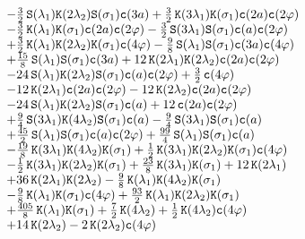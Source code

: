 \documentclass[a4paper,12pt]{article}
\begin{document}
\begin{equation}
\begin{array}{lll}
&&-\frac{3}{2}\,\sinhx{ \lambda_1} \coshx{2 \lambda_2} \sinhx{ \sigma_1} \cosx{3 a}
+\frac{3}{2}\,\coshx{3 \lambda_1} \coshx{ \sigma_1} \cosx{2 a} \cosx{2 \varphi}\\
&&-\frac{3}{2}\,\coshx{ \lambda_1} \coshx{ \sigma_1} \cosx{2 a} \cosx{2 \varphi}
-\frac{3}{2}\,\sinhx{3 \lambda_1} \sinhx{ \sigma_1} \cosx{a} \cosx{2 \varphi}\\
&&+\frac{3}{2}\,\coshx{ \lambda_1} \coshx{2 \lambda_2} \coshx{ \sigma_1} \cosx{4 \varphi}
-\frac{9}{8}\,\sinhx{ \lambda_1} \sinhx{ \sigma_1} \cosx{3 a} \cosx{4 \varphi}\\
&&+\frac{15}{8}\,\sinhx{ \lambda_1} \sinhx{ \sigma_1} \cosx{3 a}
+12\,\coshx{2 \lambda_1} \coshx{2 \lambda_2} \cosx{2 a} \cosx{2 \varphi}\\
&&-24\,\sinhx{ \lambda_1} \coshx{2 \lambda_2} \sinhx{ \sigma_1} \cosx{a} \cosx{2 \varphi}
+\frac{3}{2}\,\cosx{4 \varphi}\\
&&-12\,\coshx{2 \lambda_1} \cosx{2 a} \cosx{2 \varphi}
-12\,\coshx{2 \lambda_2} \cosx{2 a} \cosx{2 \varphi}\\
&&-24\,\sinhx{ \lambda_1} \coshx{2 \lambda_2} \sinhx{ \sigma_1} \cosx{a}
+12\,\cosx{2 a} \cosx{2 \varphi}\\
&&+\frac{9}{4}\,\sinhx{3 \lambda_1} \coshx{4 \lambda_2} \sinhx{ \sigma_1} \cosx{a}
-\frac{9}{4}\,\sinhx{3 \lambda_1} \sinhx{ \sigma_1} \cosx{a}\\
&&+\frac{45}{2}\,\sinhx{ \lambda_1} \sinhx{ \sigma_1} \cosx{a} \cosx{2 \varphi}
+\frac{99}{4}\,\sinhx{ \lambda_1} \sinhx{ \sigma_1} \cosx{a}\\
&&-\frac{19}{8}\,\coshx{3 \lambda_1} \coshx{4 \lambda_2} \coshx{ \sigma_1}
+\frac{1}{2}\,\coshx{3 \lambda_1} \coshx{2 \lambda_2} \coshx{ \sigma_1} \cosx{4 \varphi}\\
&&-\frac{1}{2}\,\coshx{3 \lambda_1} \coshx{2 \lambda_2} \coshx{ \sigma_1}
+\frac{23}{8}\,\coshx{3 \lambda_1} \coshx{ \sigma_1}
+12\,\coshx{2 \lambda_1}\\
&&+36\,\coshx{2 \lambda_1} \coshx{2 \lambda_2}
-\frac{9}{8}\,\coshx{ \lambda_1} \coshx{4 \lambda_2} \coshx{ \sigma_1}\\
&&-\frac{9}{8}\,\coshx{ \lambda_1} \coshx{ \sigma_1} \cosx{4 \varphi}
+\frac{93}{2}\,\coshx{ \lambda_1} \coshx{2 \lambda_2} \coshx{ \sigma_1}\\
&&+\frac{405}{8}\,\coshx{ \lambda_1} \coshx{ \sigma_1}
+\frac{7}{2}\,\coshx{4 \lambda_2}
+\frac{1}{2}\,\coshx{4 \lambda_2} \cosx{4 \varphi}\\
&&+14\,\coshx{2 \lambda_2}
-2\,\coshx{2 \lambda_2} \cosx{4 \varphi}
\end{array}
\end{equation}
\end{document}
